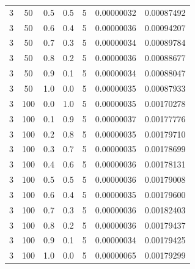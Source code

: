 \documentclass[12pt, a4paper]{report}
\begin{document}
\begin{table} [H]
\begin{tabular}[l]{|c c c c c c c|}
			3 & 50 & 0.5 & 0.5 & 5 & 0.00000032 & 0.00087492 \\
			
			3 & 50 & 0.6 & 0.4 & 5 & 0.00000036 & 0.00094207 \\
			
			3 & 50 & 0.7 & 0.3 & 5 & 0.00000034 & 0.00089784 \\
			
			3 & 50 & 0.8 & 0.2 & 5 & 0.00000036 & 0.00088677 \\
			
			3 & 50 & 0.9 & 0.1 & 5 & 0.00000034 & 0.00088047 \\
			
			3 & 50 & 1.0 & 0.0 & 5 & 0.00000035 & 0.00087933 \\
			
			3 & 100 & 0.0 & 1.0 & 5 & 0.00000035 & 0.00170278 \\
			
			3 & 100 & 0.1 & 0.9 & 5 & 0.00000037 & 0.00177776 \\
			
			3 & 100 & 0.2 & 0.8 & 5 & 0.00000035 & 0.00179710 \\
			
			3 & 100 & 0.3 & 0.7 & 5 & 0.00000035 & 0.00178699 \\
			
			3 & 100 & 0.4 & 0.6 & 5 & 0.00000036 & 0.00178131 \\
			
			3 & 100 & 0.5 & 0.5 & 5 & 0.00000036 & 0.00179008 \\
			
			3 & 100 & 0.6 & 0.4 & 5 & 0.00000035 & 0.00179600 \\
			
			3 & 100 & 0.7 & 0.3 & 5 & 0.00000036 & 0.00182403 \\
			
			3 & 100 & 0.8 & 0.2 & 5 & 0.00000036 & 0.00179437 \\
			
			3 & 100 & 0.9 & 0.1 & 5 & 0.00000034 & 0.00179425 \\
			
			3 & 100 & 1.0 & 0.0 & 5 & 0.00000065 & 0.00179299 \\\hline
		\end{tabular}
	\end{table}
	
\end{document}
